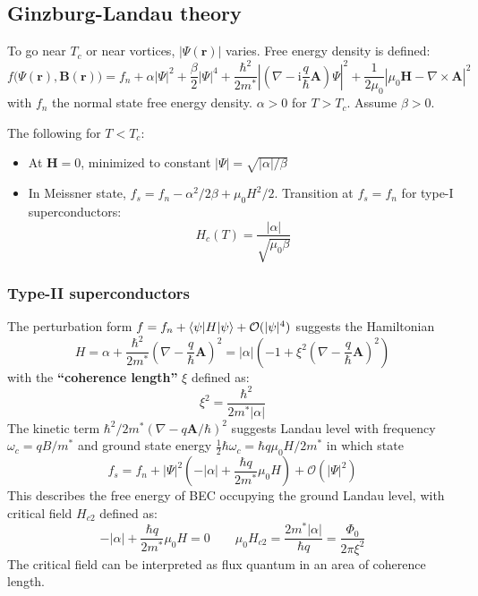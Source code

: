 \documentclass[11pt,letterpaper]{article}
\numberwithin{equation}{section} %
\renewcommand*{\vec}[1]{\bm{#1}}
\newcommand\mi{\mathrm{i}}
\begin{document}
\subsection{Ginzburg-Landau theory}
\label{sub:ginzburg_landau_theory}
To go near $T_c$ or near vortices, $|\Psi(\vec r)|$ varies. Free energy
density is defined: 
\begin{equation}
	f\big(\Psi(\vec r), \vec B(\vec r)\big) = f_n + \alpha |\Psi|^2 + \frac
	\beta 2 |\Psi|^4 + \frac{\hbar^2}{2m^*} \left| \left( \nabla - \mi\frac
	q\hbar \vec A \right)\Psi \right|^2 + \frac 1{2\mu_0} \left| \mu_0 \vec H
	- \nabla\times\vec A \right|^2
\end{equation}
with $f_n$ the normal state free energy density. $\alpha > 0$ for $T > T_c$.
Assume $\beta > 0$. 

The following for $T < T_c$:
\begin{itemize}
	\item At $\vec H = 0$, minimized to constant $|\Psi| =
		\sqrt{|\alpha|/\beta}$
	\item In Meissner state, $f_s = f_n - \alpha^2/2\beta + \mu_0 H^2/2$.
		Transition at $f_s = f_n$ for type-I superconductors: 
		\begin{equation}\label{eq:hc}
			H_c(T) = \frac{|\alpha|}{\sqrt{\mu_0 \beta}}
		\end{equation}
\end{itemize}

\subsubsection{Type-II superconductors}
\label{ssub:type_ii_superconductors}
The perturbation form $f = f_n + \braket{\psi|H|\psi} + \mathcal O(|\psi|^4)$
suggests the Hamiltonian
\begin{equation}
	H = \alpha + \frac{\hbar^2}{2m^*} \left( \nabla - \frac q\hbar \vec A
		\right)^2 = |\alpha| \left( -1 + \xi^2 \left( \nabla - \frac q\hbar
	\vec A \right)^2 \right)
\end{equation}
with the \textbf{``coherence length''} $\xi$ defined as: 
\begin{equation}
	\xi^2 = \frac{\hbar^2}{2m^*|\alpha|}
\end{equation}
The kinetic term $\hbar^2/2m^* (\nabla - q\vec A /\hbar)^2$ suggests Landau
level with frequency $\omega_c = qB/m^*$ and ground state energy $\frac12
\hbar \omega_c = \hbar q \mu_0 H /2m^*$ in which state
\begin{equation}
	f_s = f_n + |\Psi|^2 \left( -|\alpha| + \frac{\hbar q}{2m^*}\mu_0 H
	\right) + \mathcal O(|\Psi|^2)
\end{equation}
This describes the free energy of BEC occupying the ground Landau level, with
critical field $H_{c2}$ defined as: 
\begin{equation}
  -|\alpha| + \frac{\hbar q}{2m^*}\mu_0 H = 0
  \qquad 
  \mu_0 H_{c2} = \frac{2m^*|\alpha|}{\hbar q} = \frac{\Phi_0}{2\pi\xi^2}
\end{equation}
The critical field can be interpreted as flux quantum in an area of coherence
length. 
\end{document}
